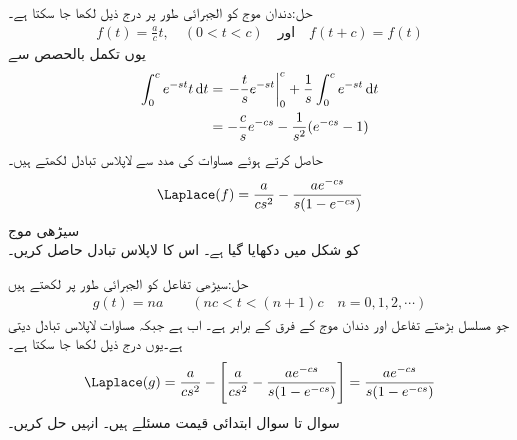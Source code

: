حل:دندان موج کو الجبرائی طور پر درج ذیل لکھا جا سکتا ہے۔
\begin{align*}
f(t)=\frac{a}{c}t, \quad (0<t<c)\quad \text{اور}\quad f(t+c)=f(t)
\end{align*}
یوں تکمل بالحصص سے 
\begin{align*}
\int_{0}^{c} e^{-st} t\dif t&=\left.-\frac{t}{s}e^{-st} \right |_{0}^{c}+\frac{1}{s}\int_{0}^{c}e^{-st}\dif t\\
&=-\frac{c}{s}e^{-cs}-\frac{1}{s^2}(e^{-cs}-1)
\end{align*}
حاصل کرتے ہوئے  مساوات  کی مدد سے لاپلاس تبادل لکھتے ہیں۔
\begin{align}\label{مساوات_لاپلاس_دندان}
\Laplace(f)=\frac{a}{cs^2}-\frac{ae^{-cs}}{s(1-e^{-cs})}
\end{align}
\quad سیڑھی موج\\
 کو شکل  میں دکھایا گیا ہے۔ اس کا لاپلاس تبادل حاصل کریں۔

حل:سیڑھی تفاعل کو الجبرائی طور پر لکھتے ہیں
\begin{align*}
g(t)=na \quad \quad (nc<t<(n+1)c\quad n=0,1,2,\cdots)
\end{align*}
جو مسلسل بڑھتے تفاعل  اور دندان موج  کے فرق   کے برابر ہے۔ اب  ہے جبکہ مساوات  لاپلاس تبادل  دیتی ہے۔یوں درج ذیل لکھا جا سکتا ہے۔
\begin{align}
\Laplace(g)=\frac{a}{cs^2}-\left[\frac{a}{cs^2}-\frac{ae^{-cs}}{s(1-e^{-cs})}\right]=\frac{ae^{-cs}}{s(1-e^{-cs})}
\end{align}
سوال  تا سوال  ابتدائی قیمت مسئلے ہیں۔ انہیں حل کریں۔

